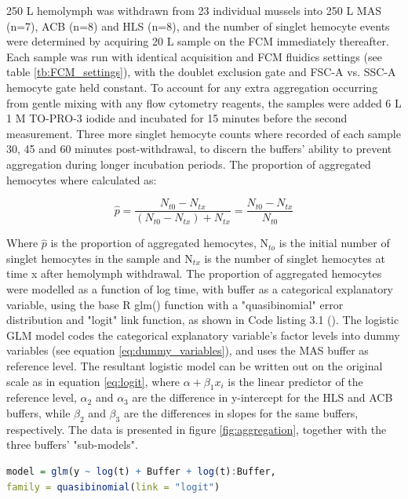 250 \micro L hemolymph was withdrawn from 23 individual mussels into 250 \micro L MAS (n=7), ACB (n=8) and HLS (n=8), and the number of singlet hemocyte events were determined by acquiring 20 \micro L sample on the FCM immediately thereafter. Each sample was run with identical acquisition and FCM fluidics settings (see table \ref{tb:FCM_settings}), with the doublet exclusion gate and FSC-A vs. SSC-A hemocyte gate held constant. To account for any extra aggregation occurring from gentle mixing with any flow cytometry reagents, the samples were added 6 \micro L 1 \micro M TO-PRO-3 iodide and incubated for 15 minutes before the second measurement. Three more singlet hemocyte counts where recorded of each sample 30, 45 and 60 minutes post-withdrawal, to discern the buffers' ability to prevent aggregation during longer incubation periods. The proportion of aggregated hemocytes where calculated as:

\begin{equation}
    \label{eq: proportion_agg}
    \hat{p} = \dfrac{N_{t0} - N_{tx}}{(N_{t0} - N_{tx}) + N_{tx}} = \dfrac{N_{t0} - N_{tx}}{N_{t0}}
\end{equation}

Where $\hat{p}$ is the proportion of aggregated hemocytes, N$_{to}$ is the initial number of singlet hemocytes in the sample and N$_{tx}$ is the number of singlet hemocytes at time x after hemolymph withdrawal. The proportion of aggregated hemocytes were modelled as a function of log time, with buffer as a categorical explanatory variable, using the base R glm() function with a "quasibinomial" error distribution and "logit" link function, as shown in Code listing 3.1 (\cite{R-project}). The logistic GLM model codes the categorical explanatory variable's factor levels into dummy variables (see equation \ref{eq:dummy_variables}), and uses the MAS buffer as reference level. The resultant logistic model can be written out on the original scale as in equation \ref{eq:logit}, where $\alpha + \beta_{1}x_{i}$ is the linear predictor of the reference level, $\alpha_{2}$ and $\alpha_{3}$ are the difference in y-intercept for the HLS and ACB buffers, while $\beta_{2}$ and $\beta_{3}$ are the differences in slopes for the same buffers, respectively. The data is presented in figure \ref{fig:aggregation}, together with the three buffers' "sub-models".

\begin{lstlisting}[language=R, float, caption = {A floating example of R code}]
model = glm(y ~ log(t) + Buffer + log(t):Buffer,
family = quasibinomial(link = "logit")
\end{lstlisting}

